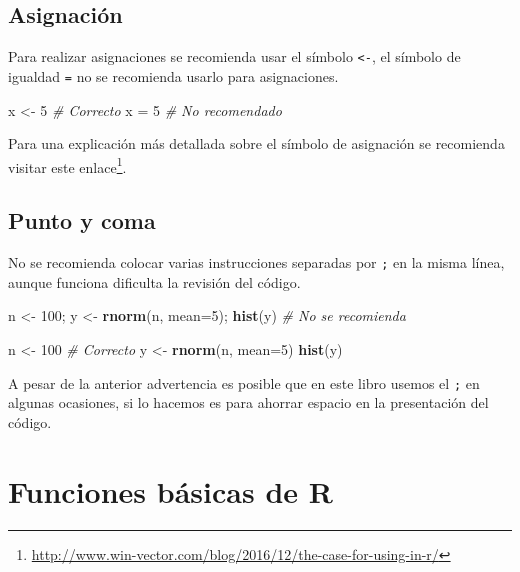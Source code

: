 \documentclass[10pt,]{krantz}
\makeatletter
\newenvironment{Shaded}{\begin{snugshade}}{\end{snugshade}}
\newcommand{\KeywordTok}[1]{\textcolor[rgb]{0.13,0.29,0.53}{\textbf{{#1}}}}
\newcommand{\DataTypeTok}[1]{\textcolor[rgb]{0.13,0.29,0.53}{{#1}}}
\newcommand{\DecValTok}[1]{\textcolor[rgb]{0.00,0.00,0.81}{{#1}}}
\newcommand{\StringTok}[1]{\textcolor[rgb]{0.31,0.60,0.02}{{#1}}}
\newcommand{\CommentTok}[1]{\textcolor[rgb]{0.56,0.35,0.01}{\textit{{#1}}}}
\newcommand{\NormalTok}[1]{{#1}}
\let\proglang=\textsf
\renewcommand{\href}[2]{#2\footnote{\url{#1}}}
\newenvironment{kframe}{%
\medskip{}
\setlength{\fboxsep}{.8em}
 \def\at@end@of@kframe{}%
 \ifinner\ifhmode%
  \def\at@end@of@kframe{\end{minipage}}%
  \begin{minipage}{\columnwidth}%
 \fi\fi%
 \def\FrameCommand##1{\hskip\@totalleftmargin \hskip-\fboxsep
 \colorbox{shadecolor}{##1}\hskip-\fboxsep
     \hskip-\linewidth \hskip-\@totalleftmargin \hskip\columnwidth}%
 \MakeFramed {\advance\hsize-\width
   \@totalleftmargin\z@ \linewidth\hsize
   \@setminipage}}%
 {\par\unskip\endMakeFramed%
 \at@end@of@kframe}
\renewenvironment{Shaded}{\begin{kframe}}{\end{kframe}}
\makeatother
\begin{document}
\section{Asignación}\label{asignacion}

Para realizar asignaciones se recomienda usar el símbolo
\texttt{\textless{}-}, el símbolo de igualdad \texttt{=} no se
recomienda usarlo para asignaciones.

\begin{Shaded}
\begin{Highlighting}[]
\NormalTok{x <-}\StringTok{ }\DecValTok{5}  \CommentTok{# Correcto}
\NormalTok{x =}\StringTok{ }\DecValTok{5}   \CommentTok{# No recomendado}
\end{Highlighting}
\end{Shaded}

Para una explicación más detallada sobre el símbolo de asignación se
recomienda visitar este
\href{http://www.win-vector.com/blog/2016/12/the-case-for-using-in-r/}{enlace}.

\section{Punto y coma}\label{punto-y-coma}

No se recomienda colocar varias instrucciones separadas por \texttt{;}
en la misma línea, aunque funciona dificulta la revisión del código.

\begin{Shaded}
\begin{Highlighting}[]
\NormalTok{n <-}\StringTok{ }\DecValTok{100}\NormalTok{; y <-}\StringTok{ }\KeywordTok{rnorm}\NormalTok{(n, }\DataTypeTok{mean=}\DecValTok{5}\NormalTok{); }\KeywordTok{hist}\NormalTok{(y)  }\CommentTok{# No se recomienda}

\NormalTok{n <-}\StringTok{ }\DecValTok{100}                                  \CommentTok{# Correcto}
\NormalTok{y <-}\StringTok{ }\KeywordTok{rnorm}\NormalTok{(n, }\DataTypeTok{mean=}\DecValTok{5}\NormalTok{)}
\KeywordTok{hist}\NormalTok{(y)}
\end{Highlighting}
\end{Shaded}

A pesar de la anterior advertencia es posible que en este libro usemos
el \texttt{;} en algunas ocasiones, si lo hacemos es para ahorrar
espacio en la presentación del código.

\chapter{\texorpdfstring{Funciones básicas de \proglang{R}
\label{funbas}}{Funciones básicas de  }}\label{funciones-basicas-de}
\end{document}
